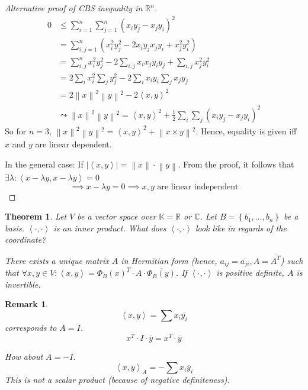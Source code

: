\documentclass[a4paper]{article}
\newcounter{lecref}[section]
\numberwithin{lecref}{section}
\newtheorem{theorem}[lecref]{Theorem}
\newtheorem*{Remark}{Remark}
\newcommand{\set}[1]{\left\{#1\right\}}
\newcommand{\angel}[1]{\left\langle#1\right\rangle}
\newcommand{\norm}[1]{\left\|#1\right\|}
\newcommand{\card}[1]{\left|#1\right|}
\begin{document}
\begin{proof}[Alternative proof of CBS inequality in $\mathbb R^n$]
  \begin{align*}
    0 &\leq \sum_{i=1}^n \sum_{j=1}^n (x_i y_j - x_j y_i)^2 \\
      &= \sum_{i,j=1}^n \left(x_i^2 y_j^2 - 2 x_i y_j x_j y_i + x_j^2 y_i^2\right) \\
      &= \sum_{i,j}^n x_i^2 y_j^2 - 2 \sum_{i,j} x_i x_j y_i y_j + \sum_{i,j} x_j^2 y_i^2 \\
      &= 2 \sum_i x_i^2 \sum_j y_j^2 - 2 \sum_i x_i y_i \sum_j x_j y_j \\
      &= 2 \norm{x}^2 \norm{y}^2 - 2 \angel{x,y}^2 \\
      &\leadsto \norm{x}^2 \norm{y}^2 = \angel{x,y}^2 + \frac12 \sum_i \sum_j (x_i y_j - x_j y_i)^2
  \end{align*}
  So for $n=3$, $\norm{x}^2 \norm{y}^2 = \angel{x,y}^2 + \norm{x \times y}^2$.
  Hence, equality is given iff $x$ and $y$ are linear dependent.

  In the general case:
  If $\card{\angel{x,y}} = \norm{x} \cdot \norm{y}$.
  From the proof, it follows that
  $\exists \lambda: \angel{x - \lambda y, x - \lambda y} = 0$
  \[ \implies x - \lambda y = 0 \implies x,y \text{ are linear independent} \]
\end{proof}

\begin{theorem} %
  Let $V$ be a vector space over $\mathbb K = \mathbb R$ or $\mathbb C$.
  Let $B = \set{b_1, \dots, b_n}$ be a basis.
  $\angel{\cdot,\cdot}$ is an inner product.
  What does $\angel{\cdot,\cdot}$ look like in regards of the coordinate?

  There exists a unique matrix $A$ in Hermitian form (hence, $a_{ij} = \overline{a_{ji}}, A = \overline{A^T}$)
  such that $\forall x,y \in V: \angel{x,y} = \Phi_B(x)^T \cdot A \cdot \overline{\Phi_B(y)}$.
  If $\angel{\cdot,\cdot}$ is positive definite, $A$ is invertible.
\end{theorem}

\begin{Remark}
  \[ \angel{x,y} = \sum x_i \overline{y_i} \]
  corresponds to $A = I$.
  \[ x^T \cdot I \cdot \overline{y} = x^T \cdot \overline{y} \]

  How about $A = -I$.
  \[ \angel{x,y}_A = -\sum x_i \overline{y}_i \]
  This is not a scalar product (because of negative definiteness).
\end{Remark}
\end{document}
